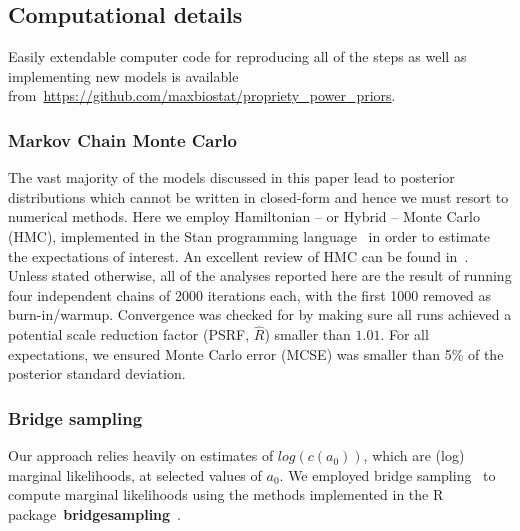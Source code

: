 \documentclass[a4paper, notitlepage, 11pt]{article}
\begin{document}
\subsection{Computational details}
\label{sec:comp_details}

Easily extendable computer code for reproducing all of the steps as well as implementing new models is available from~\url{https://github.com/maxbiostat/propriety_power_priors}.

\subsubsection{Markov Chain Monte Carlo}
\label{sec:mcmc}

The vast majority of the models discussed in this paper lead to posterior distributions which cannot be written in closed-form and hence we must resort to numerical methods.
Here we employ Hamiltonian -- or Hybrid -- Monte Carlo (HMC), implemented in the Stan programming language~ \citep{Carpenter2017} in order to estimate the expectations of interest.
An excellent review of HMC can be found in~\cite{Neal2011}.
Unless stated otherwise, all of the analyses reported here are the result of running four independent chains of 2000 iterations each, with the first 1000 removed as burn-in/warmup.
Convergence was checked for by making sure all runs achieved a potential scale reduction factor (PSRF, $\hat{R}$) smaller than $1.01$.
For all expectations, we ensured Monte Carlo error (MCSE) was smaller than 5\% of the posterior standard deviation.


\subsubsection{Bridge sampling}
\label{sec:bridge}

Our approach relies heavily on estimates of $log(c(a_0))$, which are (log) marginal likelihoods, at selected values of $a_0$.
We employed bridge sampling~\citep{Meng1996,Meng2002} to compute marginal likelihoods using the methods implemented in the R package~\textbf{bridgesampling}~\citep{Gronau2017}.
\end{document}
